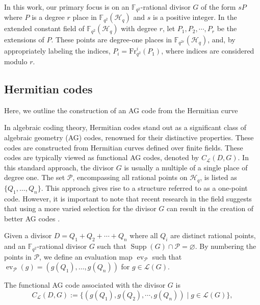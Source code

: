 \documentclass[a4paper]{amsart}
\theoremstyle{plain}
\theoremstyle{definition}
\theoremstyle{remark}
\DeclareMathOperator{\ev}{ev}
\newcommand{\calP}{\mathcal{P}}
\newcommand{\calL}{\mathcal{L}}
\newcommand{\Supp}{\operatorname{Supp}}
\begin{document}
In this work, our primary focus is on an $\mathbb{F}_{q^2}$-rational divisor $G$ of the form $ sP$ where $P$ is a degree $r$ place in $\mathbb{F}_{q^2}(\mathscr{H}_q)$ and $s$ is a positive integer. In the extended constant field of $\mathbb{F}_{q^2}(\mathscr{H}_q)$ with degree $r$, let $P_1, P_2, \cdots, P_r$ be the extensions of $P$. These points are degree-one places in $\mathbb{F}_{q^{2r}}(\mathscr{H}_q)$, and, by appropriately labeling the indices, $P_{i} = \text{Fr}^i_{q^2}(P_1)$, where indices are considered modulo $r$.




\subsection*{Hermitian codes}
Here, we outline the construction of an AG code from the Hermitian curve


In algebraic coding theory, Hermitian codes stand out as a significant class of algebraic geometry (AG) codes, renowned for their distinctive properties. These codes are constructed from Hermitian curves defined over finite fields. These codes are typically viewed as functional AG codes, denoted by $C_{\mathcal{L}}(D, G)$. In this standard approach, the divisor $G$ is usually a multiple of a single place of degree one. The set $\mathcal{P}$, encompassing all rational points on $\mathscr{H}_q$, is listed as $\{Q_1, \ldots, Q_{n}\}$. This approach gives rise to a structure referred to as a one-point code. However, it is important to note that recent research in the field suggests that using a more varied selection for the divisor $G$ can result in the creation of better AG codes \cite{matthews2005one,korchmaros2013hermitian}.



Given a divisor $D=Q_1+Q_2+\cdots+Q_n$ where all $Q_i$ are distinct rational points, and an $\mathbb{F}_{q^2}$-rational divisor $G$ such that $\Supp(G) \cap \calP = \varnothing$. By numbering the points in $\calP$, we define an evaluation map $\ev_{\calP}$ such that $\ev_{\calP}(g) = (g(Q_1),\dots,g(Q_n))$ for $g \in \calL(G)$. 


The functional AG code associated with the divisor $G$ is
\[C_{\calL}(D,G) := \{(g(Q_1),g(Q_2),\cdots,g(Q_n)) \mid g \in \calL(G)\},\]



\end{document}
